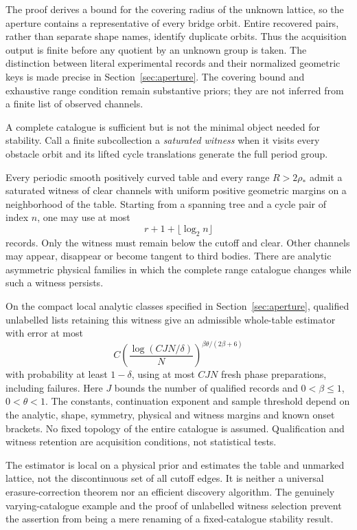 The proof derives a bound for the covering radius of the unknown lattice,
so the aperture contains a representative of every bridge orbit. Entire
recovered pairs, rather than separate shape names, identify duplicate
orbits. Thus the acquisition output is finite before any quotient by an
unknown group is taken. The distinction between literal experimental
records and their normalized geometric keys is made precise in
Section~\ref{sec:aperture}. The covering bound and exhaustive range
condition remain substantive priors; they are not inferred from a finite
list of observed channels.

A complete catalogue is sufficient but is not the minimal object needed
for stability. Call a finite subcollection a \emph{saturated witness}
when it visits every obstacle orbit and its lifted cycle translations
generate the full period group.

\begin{theorem}\label{thm:persistence-main}
Every periodic smooth positively curved table and every range
$R>2\rho_*$ admit a saturated witness of clear channels with uniform
positive geometric margins on a neighborhood of the table. Starting
from a spanning tree and a cycle pair of index $n$, one may use at most
\[
                       r+1+\lfloor\log_2 n\rfloor
\]
records. Only the witness must remain below the cutoff and clear.
Other channels may appear, disappear or become tangent to third bodies.
There are analytic asymmetric physical families in which the complete
range catalogue changes while such a witness persists.

On the compact local analytic classes specified in
Section~\ref{sec:aperture}, qualified unlabelled lists retaining this
witness give an admissible whole-table estimator with error at most
\[
 C\left(\frac{\log(CJN/\delta)}{N}\right)^{\beta\theta/(2\beta+6)}
\]
with probability at least $1-\delta$, using at most $CJN$ fresh
phase preparations, including failures. Here $J$ bounds the number of
qualified records and $0<\beta\le1$, $0<\theta<1$. The constants,
continuation exponent and sample threshold depend on the analytic,
shape, symmetry, physical and witness margins and known onset brackets.
No fixed topology of the entire catalogue is assumed. Qualification and
witness retention are acquisition conditions, not statistical tests.
\end{theorem}

The estimator is local on a physical prior and estimates the table and
unmarked lattice, not the discontinuous set of all cutoff edges. It is
neither a universal erasure-correction theorem nor an efficient discovery
algorithm. The genuinely varying-catalogue example and the proof of
unlabelled witness selection prevent the assertion from being a mere
renaming of a fixed-catalogue stability result.

